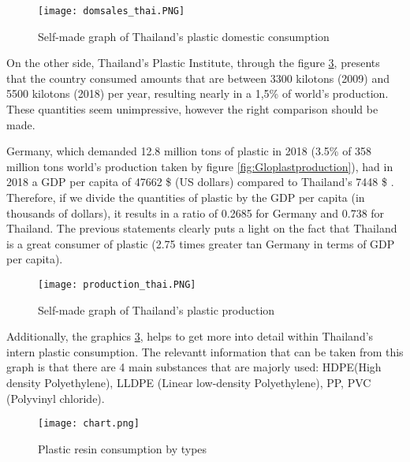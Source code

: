 \documentclass[twoside,a4paper,12pt]{report}
\begin{document}
\begin{figure}[H]
    \centering
    \texttt{[image: domsales\_thai.PNG]}
    \caption{Self-made graph of Thailand's plastic domestic consumption \cite{OffiIndustEcon}}
     \label{consumpttonsthai} 
\end{figure}

On the other side, Thailand's Plastic Institute, through the figure \ref{plastats2018resin_consumption}, presents that the country consumed amounts that are between 3300 kilotons (2009) and 5500 kilotons (2018) per year, resulting nearly in a 1,5\% of world's production. These quantities seem unimpressive, however the right comparison should be made.

Germany, which demanded 12.8 million tons of plastic in 2018 \cite{Plas19} (3.5\% of 358 million tons world's production taken by figure \ref{fig:Gloplastproduction}), had in 2018 a GDP per capita of 47662 \$ (US dollars) compared to Thailand's 7448 \$ \cite{IMFweo2019}. Therefore, if we divide the quantities of plastic by the GDP per capita (in thousands of dollars), it results in a ratio of 0.2685 for Germany and 0.738 for Thailand. The previous statements clearly puts a light on the fact that Thailand is a great consumer of plastic (2.75 times greater tan Germany in terms of GDP per capita).

\begin{figure}[h]
    \centering
    \texttt{[image: production\_thai.PNG]}
    \caption{Self-made graph of Thailand's plastic production \cite{OffiIndustEcon}}
     \label{prodtonsthai} 
\end{figure}

Additionally, the graphics \ref{plastats2018resin_consumption}, helps to get more into detail within Thailand's intern plastic consumption. The relevantt information that can be taken from this graph is that there are 4 main substances that are majorly used: HDPE(High density Polyethylene), LLDPE (Linear low-density Polyethylene), PP, PVC (Polyvinyl chloride). 

\begin{figure}[H]
    \centering
    \texttt{[image: chart.png]}
    \caption{Plastic resin consumption by types \cite{Plastats2018}}
     \label{plastats2018resin_consumption} 
\end{figure}

\end{document}
